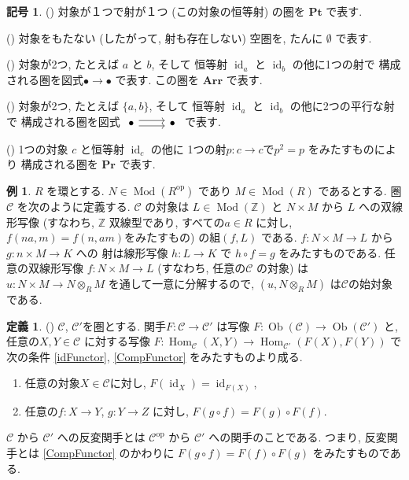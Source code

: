 \documentclass[a5paper, dvipdfmx]{jsbook}
\theoremstyle{definition}
\newtheorem{Definition}[Axiom]{定義}
\newtheorem{Example}[Axiom]{例}
\newtheorem{Notation}[Axiom]{記号}
\newcommand{\Z}{\mathbb{Z}}
\newcommand{\mcal}{\mathcal}
\newcommand{\id}{\mathop{\mathrm{id}}\nolimits} %
\newcommand{\Ob}{\mathop{\mathrm{Ob}}\nolimits}
\numberwithin{equation}{section} %
\newcommand{\Hom}{\mathop{\mathrm{Hom}}\nolimits}
\newcommand{\Mod}{\mathop{\mathrm{Mod}}\nolimits}
\def\rnum#1{\expandafter{\romannumeral #1}}
\begin{document}
\begin{Notation}
  (\rnum{1})
  対象が１つで射が１つ (この対象の恒等射) 
  の圏を $\mathbf{Pt}$ で表す. 
  
  (\rnum{2}) 
  対象をもたない (したがって, 射も存在しない) 空圏を, 
  たんに $\emptyset$ で表す. 

  (\rnum{3}) 
  対象が2つ, たとえば $a$ と $b$, そして
  恒等射 ${\id}_a$ と ${\id}_b$ の他に1つの射で
  構成される圏を図式$\bullet \to \bullet$ で表す. 
  この圏を $\mathbf{Arr}$ で表す. 

  (\rnum{4}) 
  対象が2つ, たとえば $\{a,b\}$, そして
  恒等射 ${\id}_a$ と ${\id}_b$ の他に2つの平行な射で
  構成される圏を図式
    $
    \begin{tikzcd}
      {\bullet}
        \arrow[r, shift left]
        \arrow[r, shift right]
      & {\bullet}
    \end{tikzcd}
    $
  で表す. 

  (\rnum{5}) 
  1つの対象 $c$ と恒等射 ${\id}_c$ の他に
  1つの射$p: c \to c$で$p^2 = p$ をみたすものにより
  構成される圏を $\mathbf{Pr}$ で表す. 
\end{Notation}

\begin{Example}
  $R$ を環とする. $N \in \Mod(R^{\mathrm{op}})$ であり
  $M \in \Mod(R)$ であるとする. 
  圏$\mcal{C}$ を次のように定義する. 
  $\mcal{C}$ の対象は $L \in \Mod(\Z)$ と 
  $N\times M$ から $L$ への双線形写像
  (すなわち, $\Z$ 双線型であり, すべての$a\in R$ に対し, 
  $f(na,m)=f(n,am)$をみたすもの)
  の組$(f,L)$ である. 
  $f: N\times M \to L$ から $g: n\times M \to K$ への
  射は線形写像 $h: L \to K$ で $h\circ f = g$ 
  をみたすものである. 
  任意の双線形写像 $f: N\times M \to L$ 
  (すなわち, 任意の$\mcal{C}$ の対象) は
  $u: N\times M \to N\otimes _{R} M$ 
  を通して一意に分解するので, $(u, N\otimes _{R} M)$ 
  は$\mcal{C}$の始対象である. 
\end{Example}

\begin{Definition}
  (\rnum{1}) 
  $\mcal{C}$, $\mcal{C}'$を圏とする. 
  関手$F: \mcal{C} \to \mcal{C}'$ は写像
  $F: \Ob(\mcal{C}) \to \Ob(\mcal{C}')$ 
  と, 任意の$X, Y  \in \mcal{C}$  に対する写像
  $F:\Hom _{\mcal{C}}(X,Y)\to\Hom _{\mcal{C}'}(F(X),F(Y))$
  で次の条件 {\ref{idFunctor}}, {\ref{CompFunctor}} 
  をみたすものより成る. 
  \begin{enumerate}[label*=(\arabic*)]
    \item 任意の対象$X\in\mcal{C}$に対し, 
      $F(\id_X) = \id_{F(X)}$, \label{idFunctor}
    \item 任意の$f: X\to Y$, $g:Y\to Z$ に対し, 
      $F(g\circ f) = F(g)\circ F(f)$.  \label{CompFunctor}
  \end{enumerate}

  $\mcal{C}$ から $\mcal{C}'$ への反変関手とは
  ${\mcal{C}}^{\mathrm{op}}$ から $\mcal{C}'$ 
  への関手のことである. つまり, 反変関手とは
  {\ref{CompFunctor}} のかわりに 
  $F(g\circ f) = F(f)\circ F(g)$ 
  をみたすものである. 
\end{Definition}
\end{document}
